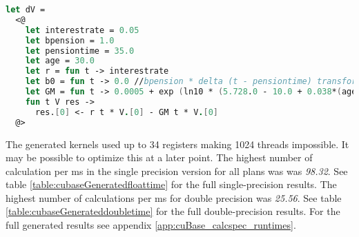 \begin{lstlisting}[language=fsharp, caption=Formatted quotation AST, label=pe_quote_format]
let dV = 
  <@
    let interestrate = 0.05
    let bpension = 1.0
    let pensiontime = 35.0
    let age = 30.0
    let r = fun t -> interestrate
    let b0 = fun t -> 0.0 //bpension * delta (t - pensiontime) transformed into bj_ii value
    let GM = fun t -> 0.0005 + exp (ln10 * (5.728.0 - 10.0 + 0.038*(age + t))) // power expression converted to exponential function expressions
    fun t V res ->
      res.[0] <- r t * V.[0] - GM t * V.[0]
  @>
\end{lstlisting}


The generated kernels used up to 34 registers making 1024 threads impossible. 
It may be possible to optimize this at a later point.
The highest number of calculation per ms in the single precision version for all plans was was \emph{98.32}.
See table \ref{table:cubaseGeneratedfloattime} for the full single-precision results. 
The highest number of calculations per ms for double precision was \emph{25.56}.
See table \ref{table:cubaseGenerateddoubletime} for the full double-precision results. 
For the full generated results see appendix \ref{app:cuBase_calcspec_runtimes}.

\begin{table}[h!]
\centering
{}
\caption{CalcSpec generated F\# Alea.cuBase calculations per ms with single precision\label{table:cubaseGeneratedfloattime}}
\end{table}

